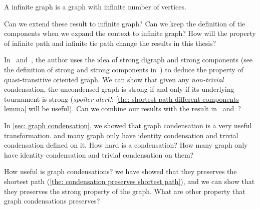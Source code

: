 \begin{definition}
  A infinite graph is a graph with infinite number of vertices.
\end{definition}

Can we extend these result to infinite graph?
Can we keep the definition of tie components when
we expand the context to infinite graph?
How will the property of infinite path
and infinite tie path change the results in this thesis?

In~\cite{bang-jensen_kings_1998}
and~\cite{bangjensen_quasitransitive_1995},
the author uses the idea of strong digraph and strong components
(see the definition of strong and strong components
in~\cite{west_introduction_2001})
to deduce the property of quasi-transitive oriented graph.
We can show that given any \emph{non-trivial} condensation,
the uncondensed graph is strong
if and only if its underlying tournament is strong
(\emph{spoiler alert!}:
\cref{the: shortest path different components lemma} will be useful).
Can we combine our results with the result
in~\cite{bang-jensen_kings_1998} and~\cite{bangjensen_quasitransitive_1995}?

In \cref{sec: graph condensation},
we showed that graph condensation is a very useful transformation.
and many graph only have identity condensation
and trivial condensation defined on it.
How hard is a condensation?
How many graph only have identity condensation
and trivial condensation on them?

How useful is graph condensations?
we have showed that they preserves the shortest path
(\cref{the: condensation preserves shortest path}),
and we can show that they preserves the strong property of the graph.
What are other property that graph condensations preserves?
